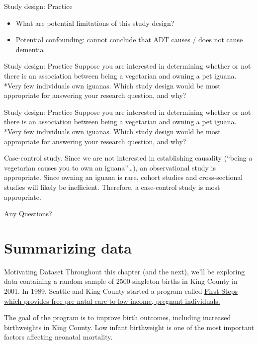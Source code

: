 \documentclass[
  ignorenonframetext,
]{beamer}
\begin{document}
\begin{frame}{Study design: Practice}
\protect\hypertarget{study-design-practice-2}{}
\begin{itemize}
\item
  What are potential limitations of this study design?
\item
  { Potential confounding: cannot conclude that ADT causes / does not
  cause dementia }
\end{itemize}
\end{frame}

\begin{frame}{Study design: Practice}
\protect\hypertarget{study-design-practice-3}{}
Suppose you are interested in determining whether or not there is an
association between being a vegetarian and owning a pet iguana. *Very
few individuals own iguanas. Which study design would be most
appropriate for answering your research question, and why?
\end{frame}

\begin{frame}{Study design: Practice}
\protect\hypertarget{study-design-practice-4}{}
Suppose you are interested in determining whether or not there is an
association between being a vegetarian and owning a pet iguana. *Very
few individuals own iguanas. Which study design would be most
appropriate for answering your research question, and why?

{ Case-control study. Since we are not interested in establishing
causality (``being a vegetarian causes you to own an iguana''\ldots), an
observational study is appropriate. Since owning an iguana is rare,
cohort studies and cross-sectional studies will likely be inefficient.
Therefore, a case-control study is most appropriate. }
\end{frame}

\begin{frame}{}
\protect\hypertarget{section-2}{}
Any Questions?
\end{frame}

\hypertarget{summarizing-data}{%
\section{Summarizing data}\label{summarizing-data}}

\begin{frame}{Motivating Dataset}
\protect\hypertarget{motivating-dataset}{}
Throughout this chapter (and the next), we'll be exploring data
containing a random sample of 2500 singleton births in King County in
2001. In 1989, Seattle and King County started a program called
\href{https://kingcounty.gov/depts/health/child-teen-health/maternity-support-infant-case-management.aspx}{First
Steps which provides free pre-natal care to low-income, pregnant
individuals.}

The goal of the program is to improve birth outcomes, including
increased birthweights in King County. Low infant birthweight is one of
the most important factors affecting neonatal mortality.
\end{frame}
\end{document}
